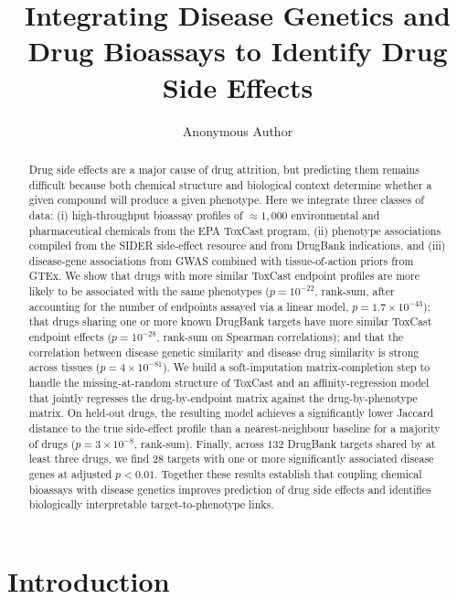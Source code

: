 \documentclass[11pt]{article}
\title{Integrating Disease Genetics and Drug Bioassays to Identify Drug Side Effects}
\author[1]{Anonymous Author}
\affil[1]{Anonymous Institution}
\date{}
\begin{document}
\maketitle

\begin{abstract}
Drug side effects are a major cause of drug attrition, but predicting them remains difficult because both chemical structure and biological context determine whether a given compound will produce a given phenotype. Here we integrate three classes of data: (i) high-throughput bioassay profiles of $\approx 1{,}000$ environmental and pharmaceutical chemicals from the EPA ToxCast program, (ii) phenotype associations compiled from the SIDER side-effect resource and from DrugBank indications, and (iii) disease-gene associations from GWAS combined with tissue-of-action priors from GTEx. We show that drugs with more similar ToxCast endpoint profiles are more likely to be associated with the same phenotypes ($p = 10^{-22}$, rank-sum, after accounting for the number of endpoints assayed via a linear model, $p = 1.7 \times 10^{-43}$); that drugs sharing one or more known DrugBank targets have more similar ToxCast endpoint effects ($p = 10^{-28}$, rank-sum on Spearman correlations); and that the correlation between disease genetic similarity and disease drug similarity is strong across tissues ($p = 4 \times 10^{-81}$). We build a soft-imputation matrix-completion step to handle the missing-at-random structure of ToxCast and an affinity-regression model that jointly regresses the drug-by-endpoint matrix against the drug-by-phenotype matrix. On held-out drugs, the resulting model achieves a significantly lower Jaccard distance to the true side-effect profile than a nearest-neighbour baseline for a majority of drugs ($p = 3 \times 10^{-8}$, rank-sum). Finally, across $132$ DrugBank targets shared by at least three drugs, we find $28$ targets with one or more significantly associated disease genes at adjusted $p < 0.01$. Together these results establish that coupling chemical bioassays with disease genetics improves prediction of drug side effects and identifies biologically interpretable target-to-phenotype links.
\end{abstract}

\section{Introduction}
\end{document}
